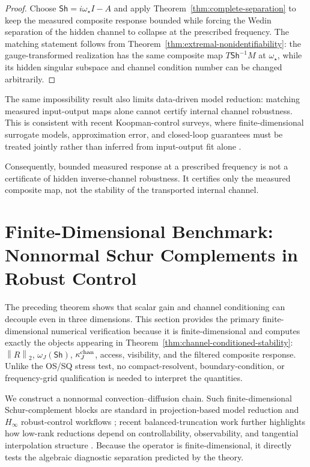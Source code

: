\documentclass[review]{siamart220329}
\theoremstyle{definition}
\theoremstyle{remark}
\newcommand{\Sh}{\mathsf{Sh}}
\newcommand{\norm}[1]{\left\lVert #1\right\rVert}
\begin{document}
\begin{proof}
Choose $\Sh=i\omega_\star I-A$ and apply
Theorem~\ref{thm:complete-separation} to keep the measured composite response
bounded while forcing the Wedin separation of the hidden channel to collapse at
the prescribed frequency. The matching statement follows from
Theorem~\ref{thm:extremal-nonidentifiability}: the gauge-transformed realization
has the same composite map $T\Sh^{-1}M$ at $\omega_\star$, while its hidden
singular subspace and channel condition number can be changed arbitrarily.
\end{proof}
The same impossibility result also limits data-driven model reduction: matching measured input-output maps alone cannot certify internal channel robustness. This is consistent with recent Koopman-control surveys, where finite-dimensional surrogate models, approximation error, and closed-loop guarantees must be treated jointly rather than inferred from input-output fit alone \cite{StraesserWorthmannMezicBerberichSchallerAllgower2026}.


Consequently, bounded measured response at a prescribed frequency is not a
certificate of hidden inverse-channel robustness. It certifies only the measured
composite map, not the stability of the transported internal channel.

\section{Finite-Dimensional Benchmark: Nonnormal Schur Complements in Robust Control}\label{sec:numerics}

The preceding theorem shows that scalar gain and channel conditioning can decouple
even in three dimensions. This section provides the primary finite-dimensional numerical verification
because it is finite-dimensional and computes exactly the objects appearing in
Theorem~\ref{thm:channel-conditioned-stability}: $\norm{R}_2$, $\omega_J(\Sh)$,
$\kappa_J^{\rm chan}$, access, visibility, and the filtered composite response.
Unlike the OS/SQ stress test, no compact-resolvent, boundary-condition, or
frequency-grid qualification is needed to interpret the quantities.

We construct a nonnormal convection--diffusion chain. Such finite-dimensional
Schur-complement blocks are standard in projection-based model reduction and
$H_\infty$ robust-control workflows \cite{BennerGugercinWillcox2015,ZhouDoyleGlover1996}; recent balanced-truncation work further highlights how low-rank reductions depend on controllability, observability, and tangential interpolation structure \cite{ZulfiqarXiaoSongSreeram2025}.
Because the operator is finite-dimensional, it directly tests the algebraic
diagnostic separation predicted by the theory.
\end{document}

